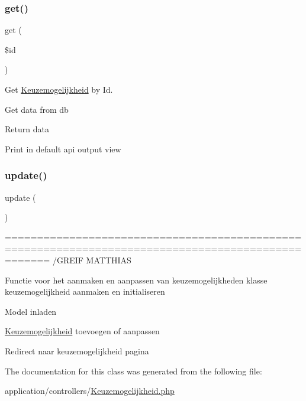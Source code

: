 \subsubsection{\texorpdfstring{get()}{get()}}
{\footnotesize\ttfamily get (\begin{DoxyParamCaption}\item[{}]{\$id }\end{DoxyParamCaption})}



Get \mbox{\hyperlink{class_keuzemogelijkheid}{Keuzemogelijkheid}} by Id. 

Get data from db

Return data

Print in default api output view \mbox{\label{class_keuzemogelijkheid_a842e4774e3b3601a005b995c02f7e883}} 
\subsubsection{\texorpdfstring{update()}{update()}}
{\footnotesize\ttfamily update (\begin{DoxyParamCaption}{ }\end{DoxyParamCaption})}



=================================================================================================== /\+G\+R\+E\+IF M\+A\+T\+T\+H\+I\+AS 

Functie voor het aanmaken en aanpassen van keuzemogelijkheden klasse keuzemogelijkheid aanmaken en initialiseren

Model inladen

\mbox{\hyperlink{class_keuzemogelijkheid}{Keuzemogelijkheid}} toevoegen of aanpassen

Redirect naar keuzemogelijkheid pagina 

The documentation for this class was generated from the following file\+:\begin{DoxyCompactItemize}
\item 
application/controllers/\mbox{\hyperlink{_keuzemogelijkheid_8php}{Keuzemogelijkheid.\+php}}\end{DoxyCompactItemize}
